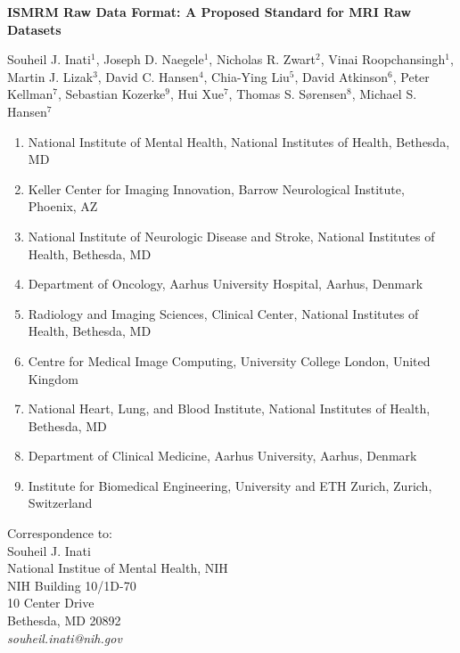 \documentclass[12pt]{article}
\begin{document}
\chead{}
\rhead{\thepage}
\lfoot{}
\cfoot{}
\rfoot{}

\newpage
\clearpage
\pagestyle{empty}

\begin{center}
\large \textbf{ISMRM Raw Data Format: A Proposed Standard for MRI Raw Datasets}

\normalsize
\singlespacing
Souheil J. Inati$^1$,
Joseph D. Naegele$^1$, 
Nicholas R. Zwart$^2$,
Vinai Roopchansingh$^1$,
Martin J. Lizak$^3$,
David C. Hansen$^4$,
Chia-Ying Liu$^5$,
David Atkinson$^6$,
Peter Kellman$^7$,
Sebastian Kozerke$^9$,
Hui Xue$^7$,
Thomas S. S{\o}rensen$^8$,
Michael S. Hansen$^7$
\end{center}

\begin{enumerate}
\item National Institute of Mental Health, National Institutes of Health, Bethesda, MD
\item Keller Center for Imaging Innovation, Barrow Neurological Institute, Phoenix, AZ
\item National Institute of Neurologic Disease and Stroke, National Institutes of Health, Bethesda, MD
\item Department of Oncology, Aarhus University Hospital, Aarhus, Denmark
\item Radiology and Imaging Sciences, Clinical Center, National Institutes of Health, Bethesda, MD
\item Centre for Medical Image Computing, University College London, United Kingdom
\item National Heart, Lung, and Blood Institute, National Institutes of Health, Bethesda, MD
\item Department of Clinical Medicine, Aarhus University, Aarhus, Denmark
\item Institute for Biomedical Engineering, University and ETH Zurich, Zurich, Switzerland
\end{enumerate}

\vspace{2mm}
Correspondence to: \\
Souheil J. Inati \\
National Institue of Mental Health, NIH \\
NIH Building 10/1D-70 \\
10 Center Drive \\
Bethesda, MD 20892 \\
\textit{souheil.inati@nih.gov} \\
\end{document}
